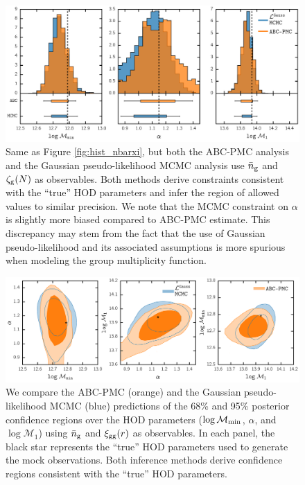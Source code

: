 \begin{figure}
\includegraphics[width=1.\textwidth]{figs/abc/paper_ABCvsMCMC_nbargmf.pdf}
\caption{\label{fig:hist_nbargmf} 
Same as Figure \ref{fig:hist_nbarxi}, but both the ABC-PMC
analysis and the Gaussian pseudo-likelihood MCMC analysis use $\bar{n}_{\mathrm{g}}$ and $\mathcal{\zeta}_{\rm g}(N)$ as 
observables. Both methods derive constraints consistent with the ``true'' HOD parameters 
and infer the region of allowed values to similar precision. We note that the MCMC constraint 
on $\alpha$ is slightly more biased compared to ABC-PMC estimate. This discrepancy may stem 
from the fact that the use of Gaussian pseudo-likelihood and its associated assumptions is more 
spurious when modeling the group multiplicity function.}
\end{figure}

\begin{figure}
\includegraphics[width=1.\textwidth]{figs/abc/paper_ABCvsMCMC_contour_nbarxi.pdf}
\caption{\label{fig:cont_nbarxi}
We compare the ABC-PMC (orange) and the Gaussian pseudo-likelihood MCMC (blue)
predictions of the 68\% and 95\% posterior confidence regions over the HOD 
parameters ($\log \mathcal{M}_{\rm min}$, $\alpha$, and $\log \mathcal{M}_{1}$) 
using $\bar{n}_{\mathrm{g}}$ and $\xi_{\mathrm{gg}}(r)$ as observables. In each panel, the black star
represents the ``true'' HOD parameters used to generate the mock observations. 
Both inference methods derive confidence regions consistent with the ``true'' 
HOD parameters.
}
\end{figure}

